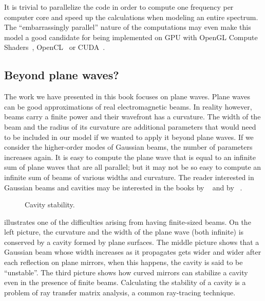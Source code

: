 It is trivial to parallelize the code in order to compute one frequency per computer core and speed up the calculations when modeling an entire spectrum.
The ``embarrassingly parallel'' nature of the computations may even make this model a good candidate for being implemented on GPU
with OpenGL Compute Shaders~\cite{opengl},
OpenCL~\cite{opencl}
or CUDA~\cite{cuda}.




\subsection{Beyond plane waves?}
The work we have presented in this book focuses on plane waves.
Plane waves can be good approximations of real electromagnetic beams.
In reality however, beams carry a finite power and their wavefront has a curvature.
The width of the beam and the radius of its curvature are additional parameters that would need to be included in our model if we wanted to apply it beyond plane waves.
If we consider the higher-order modes of Gaussian beams, the number of parameters increases again.
It is easy to compute the plane wave that is equal to an infinite sum of plane waves that are all parallel;
but it may not be so easy to compute an infinite sum of beams of various widths and curvature.
The reader interested in Gaussian beams and cavities may be interested in the books
 by \citeauthor{goldsmith1998quasioptical}~\cite{goldsmith1998quasioptical} and
 by \citeauthor{siegman1986lasers}~\cite{siegman1986lasers}.

\begin{figure}[hbtp]
    \centering
    \footnotesize
    
    \caption{Cavity stability.}
    \label{fig:cavity_stability}
\end{figure}

 illustrates one of the difficulties arising from having finite-sized beams.
On the left picture, the curvature and the width of the plane wave (both infinite) is conserved by a cavity formed by plane surfaces.
The middle picture shows that a Gaussian beam whose width increases as it propagates gets wider and wider after each reflection on plane mirrors, when this happens, the cavity is said to be ``unstable''.
The third picture shows how curved mirrors can stabilize a cavity even in the presence of finite beams.
Calculating the stability of a cavity is a problem of ray transfer matrix analysis, a common ray-tracing technique.

